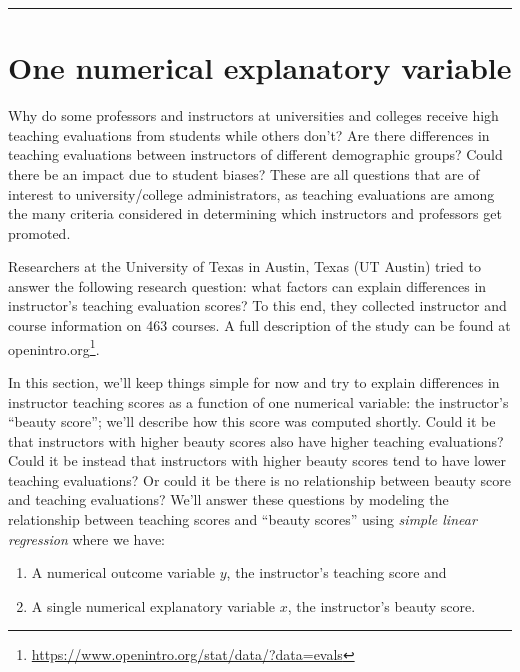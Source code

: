 \documentclass[12pt, krantz2,]{krantz}
\providecommand{\tightlist}{%
  \setlength{\itemsep}{0pt}\setlength{\parskip}{0pt}}
\renewcommand{\href}[2]{#2\footnote{\url{#1}}}
\begin{document}
\begin{center}\rule{0.5\linewidth}{\linethickness}\end{center}

\hypertarget{model1}{%
\section{One numerical explanatory variable}\label{model1}}

Why do some professors and instructors at universities and colleges receive high teaching evaluations from students while others don't? Are there differences in teaching evaluations between instructors of different demographic groups? Could there be an impact due to student biases? These are all questions that are of interest to university/college administrators, as teaching evaluations are among the many criteria considered in determining which instructors and professors get promoted.

Researchers at the University of Texas in Austin, Texas (UT Austin) tried to answer the following research question: what factors can explain differences in instructor's teaching evaluation scores? To this end, they collected instructor and course information on 463 courses. A full description of the study can be found at \href{https://www.openintro.org/stat/data/?data=evals}{openintro.org}.

In this section, we'll keep things simple for now and try to explain differences in instructor teaching scores as a function of one numerical variable: the instructor's ``beauty score''; we'll describe how this score was computed shortly. Could it be that instructors with higher beauty scores also have higher teaching evaluations? Could it be instead that instructors with higher beauty scores tend to have lower teaching evaluations? Or could it be there is no relationship between beauty score and teaching evaluations? We'll answer these questions by modeling the relationship between teaching scores and ``beauty scores'' using \emph{simple linear regression} where we have:

\begin{enumerate}
\def\labelenumi{\arabic{enumi}.}
\tightlist
\item
  A numerical outcome variable \(y\), the instructor's teaching score and
\item
  A single numerical explanatory variable \(x\), the instructor's beauty score.
\end{enumerate}
\end{document}
